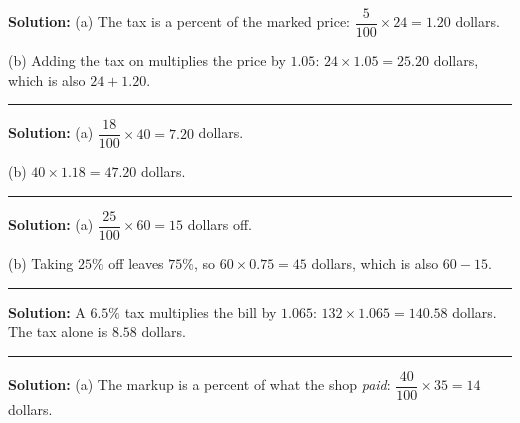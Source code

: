 \documentclass[12pt]{article}
\begin{document}



\textbf{Solution:} (a) The tax is a percent of the marked price:
$\dfrac{5}{100} \times 24 = 1.20$ dollars. 

(b) Adding the tax on multiplies the price by $1.05$:
$24 \times 1.05 = 25.20$ dollars, which is also $24 + 1.20$. 

\vspace{0.25cm}\noindent\rule{\linewidth}{0.2pt}\vspace{0.25cm}


\textbf{Solution:} (a) $\dfrac{18}{100} \times 40 = 7.20$ dollars. 

(b) $40 \times 1.18 = 47.20$ dollars. 

\vspace{0.25cm}\noindent\rule{\linewidth}{0.2pt}\vspace{0.25cm}


\textbf{Solution:} (a) $\dfrac{25}{100} \times 60 = 15$ dollars off. 

(b) Taking $25\%$ off leaves $75\%$, so $60 \times 0.75 = 45$ dollars, which is
also $60 - 15$. 

\vspace{0.25cm}\noindent\rule{\linewidth}{0.2pt}\vspace{0.25cm}


\textbf{Solution:} A $6.5\%$ tax multiplies the bill by $1.065$:
$132 \times 1.065 = 140.58$ dollars. The tax alone is $8.58$
dollars. 

\vspace{0.25cm}\noindent\rule{\linewidth}{0.2pt}\vspace{0.25cm}


\textbf{Solution:} (a) The markup is a percent of what the shop \emph{paid}:
$\dfrac{40}{100} \times 35 = 14$ dollars. 
\end{document}
